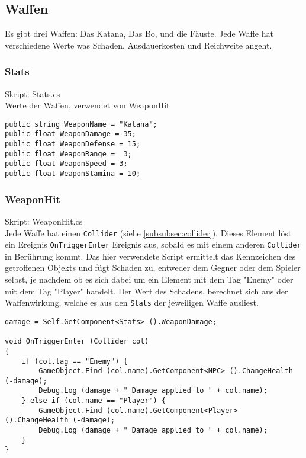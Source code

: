 \subsection{Waffen}

Es gibt drei  Waffen: Das Katana, Das Bo, und die Fäuste.
Jede Waffe hat verschiedene Werte was Schaden, Ausdauerkosten und Reichweite angeht.



\subsubsection{Stats}
Skript: Stats.cs\\
Werte der Waffen, verwendet von WeaponHit

\begin{lstlisting}
public string WeaponName = "Katana";
public float WeaponDamage = 35;
public float WeaponDefense = 15;
public float WeaponRange =	3;
public float WeaponSpeed = 3;
public float WeaponStamina = 10;
\end{lstlisting}


\subsubsection{WeaponHit}
Skript: WeaponHit.cs\\

Jede Waffe hat einen \lstinline{Collider} (siehe \cref{subsubsec:collider}). Dieses Element löst ein Ereignis \lstinline{OnTriggerEnter} Ereignis aus, sobald es mit einem anderen \lstinline{Collider} in Berührung kommt.
Das hier verwendete Script ermittelt das Kennzeichen des getroffenen Objekts und fügt Schaden zu, entweder dem Gegner oder dem Spieler selbst, je nachdem ob es sich dabei um ein Element mit dem Tag "Enemy" oder mit dem Tag "Player" handelt.
Der Wert des Schadens, berechnet sich aus der Waffenwirkung, welche es aus den \lstinline{Stats} der jeweiligen Waffe ausliest.

\begin{lstlisting}[caption={Waffentreffer}]
damage = Self.GetComponent<Stats> ().WeaponDamage;

void OnTriggerEnter (Collider col)
{
	if (col.tag == "Enemy") {
		GameObject.Find (col.name).GetComponent<NPC> ().ChangeHealth (-damage);
		Debug.Log (damage + " Damage applied to " + col.name);
	} else if (col.name == "Player") {
		GameObject.Find (col.name).GetComponent<Player> ().ChangeHealth (-damage);
		Debug.Log (damage + " Damage applied to " + col.name);
	}
}
\end{lstlisting}

